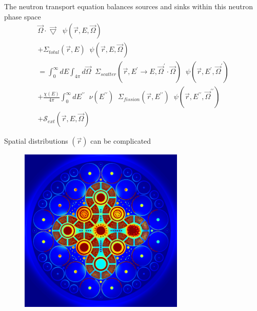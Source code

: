 \documentclass{beamer}
\begin{document}
        \begin{frame}{The neutron transport equation balances sources and sinks within this neutron phase space}
            \begin{equation*}
                \begin{split}
                    \vec \Omega \cdot \vec \bigtriangledown \; \; \psi(\vec r, E, \vec \Omega) \\
                    + \Sigma_{total}(\vec r, E) \; \; \psi(\vec r, E, \vec\Omega) \\
                    = \int_0^\infty \! \! \! \! dE \int_{4\pi} \! \! \! \! d\vec\Omega \; \; \Sigma_{scatter}(\vec r, E^\prime \rightarrow E, \vec \Omega^\prime \cdot \vec \Omega) \; \; \psi(\vec r, E^\prime, \vec\Omega^\prime) \\
                    + \frac{\chi(E)}{4\pi} \int_0^\infty \! \! \! \! dE^{\prime\prime} \; \; \nu (E^{\prime\prime}) \; \; \Sigma_{fission}(\vec r, E^{\prime\prime}) \; \; \psi(\vec r, E^{\prime\prime}, \vec\Omega^{\prime\prime}) \\
                    + \mathcal{S}_{ext}(\vec r, E, \vec\Omega)
                \end{split}
            \end{equation*}
        \end{frame}

        \begin{frame}{Spatial distributions $(\vec r)$ can be complicated}
            \begin{figure}
                \centering
                \includegraphics[width=0.7\textwidth]{./img/spaceFlux1.png}
                \caption*{}
            \end{figure}
        \end{frame}
\end{document}
